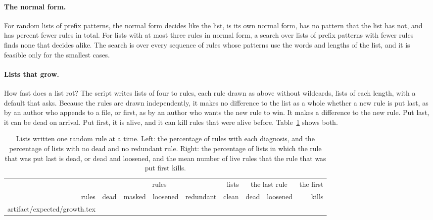 \documentclass[acmsmall,nonacm,screen]{acmart}
\makeatletter
\newcommand{\claim}[2]{#2}
\newcommand{\rows}[1]{\@@input artifact/expected/#1.tex }
\makeatother
\begin{document}
\paragraph{The normal form.} \claim{normal}{For \exPrefix{} random lists of prefix patterns,
the normal form decides like the list, is its own normal form, has no pattern that the list
has not, and has \exSaved{} percent fewer rules in total. For \exTiny{} lists with at most
three rules in normal form, a search over lists of prefix patterns with fewer rules finds
none that decides alike.} The search is over every sequence of rules whose patterns use the
words and lengths of the list, and it is feasible only for the smallest cases.

\paragraph{Lists that grow.} How fast does a list rot? The script writes lists of four to
\exGrowthLargest{} rules, each rule drawn as above without wildcards, \exGrowthRuns{} lists
of each length, with a default that asks. Because the rules are drawn independently, it makes
no difference to the list as a whole whether a new rule is put last, as by an author who
appends to a file, or first, as by an author who wants the new rule to win. It makes a
difference to the new rule. Put last, it can be dead on arrival. Put first, it is alive, and
it can kill rules that were alive before. Table~\ref{tab:growth} shows both.

\begin{table}
\caption{Lists written one random rule at a time. Left: the percentage of rules with each
diagnosis, and the percentage of lists with no dead and no redundant rule. Right: the
percentage of lists in which the rule that was put last is dead, or dead and loosened, and
the mean number of live rules that the rule that was put first kills.}\label{tab:growth}
\begin{tabular}{r@{\qquad}rrrrr@{\qquad}rr@{\qquad}r}
\toprule
 & \multicolumn{4}{c}{rules} & lists & \multicolumn{2}{c}{the last rule} & the first \\
\cmidrule(r){2-5}\cmidrule(lr){7-8}
rules & dead & masked & loosened & redundant & clean & dead & loosened & kills \\
\midrule
\rows{growth}
\bottomrule
\end{tabular}
\end{table}
\end{document}
